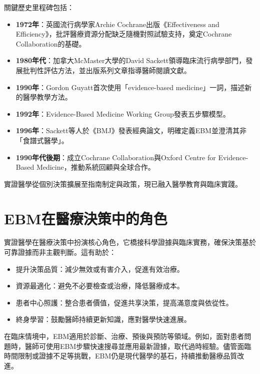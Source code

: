 關鍵歷史里程碑包括：
\begin{itemize}
    \item \textbf{1972年}：英國流行病學家Archie Cochrane出版《Effectiveness and Efficiency》，批評醫療資源分配缺乏隨機對照試驗支持，奠定Cochrane Collaboration的基礎。
    \item \textbf{1980年代}：加拿大McMaster大學的David Sackett領導臨床流行病學部門，發展批判性評估方法，並出版系列文章指導醫師閱讀文獻。
    \item \textbf{1990年}：Gordon Guyatt首次使用「evidence-based medicine」一詞，描述新的醫學教學方法。
    \item \textbf{1992年}：Evidence-Based Medicine Working Group發表五步驟模型。
    \item \textbf{1996年}：Sackett等人於《BMJ》發表經典論文，明確定義EBM並澄清其非「食譜式醫學」。
    \item \textbf{1990年代後期}：成立Cochrane Collaboration與Oxford Centre for Evidence-Based Medicine，推動系統回顧與全球合作。
\end{itemize}

實證醫學從個別決策擴展至指南制定與政策，現已融入醫學教育與臨床實踐。

\section{EBM在醫療決策中的角色}

實證醫學在醫療決策中扮演核心角色，它橋接科學證據與臨床實務，確保決策基於可靠證據而非主觀判斷。這有助於：
\begin{itemize}
    \item 提升決策品質：減少無效或有害介入，促進有效治療。
    \item 資源最適化：避免不必要檢查或治療，降低醫療成本。
    \item 患者中心照護：整合患者價值，促進共享決策，提高滿意度與依從性。
    \item 終身學習：鼓勵醫師持續更新知識，應對醫學快速進展。
\end{itemize}

在臨床情境中，EBM適用於診斷、治療、預後與預防等領域。例如，面對患者問題時，醫師可使用EBM步驟快速搜尋並應用最新證據，取代過時經驗。儘管面臨時間限制或證據不足等挑戰，EBM仍是現代醫學的基石，持續推動醫療品質改進。

% 

